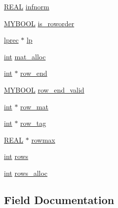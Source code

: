 \begin{DoxyCompactItemize}
\item 
\hyperlink{lp__lib_8h_a92bd5e363d131fa73669358edb232dce}{R\+E\+AL} \hyperlink{struct___m_a_trec_ac508a6beaf47f9f1634eb0cc09e7c870}{infnorm}
\item 
\hyperlink{lp__lib_8h_aad848328fb3018217ac9f01d97b6bd88}{M\+Y\+B\+O\+OL} \hyperlink{struct___m_a_trec_ae03e9166f1ec46d6dd054400e217ec43}{is\+\_\+roworder}
\item 
\hyperlink{lp__types_8h_afe42f1373b9ee8d824b5cad6a22d24c6}{lprec} $\ast$ \hyperlink{struct___m_a_trec_acfc1beee9bcf407edcd1a5e5518073fe}{lp}
\item 
\hyperlink{lp__lib_8h_adeb9ec6400320e4923ac9d836d509ddb}{int} \hyperlink{struct___m_a_trec_afe0a31a251f9914cb7e157411d08f957}{mat\+\_\+alloc}
\item 
\hyperlink{lp__lib_8h_adeb9ec6400320e4923ac9d836d509ddb}{int} $\ast$ \hyperlink{struct___m_a_trec_af3935778185f1cc1f88e0adef34de806}{row\+\_\+end}
\item 
\hyperlink{lp__lib_8h_aad848328fb3018217ac9f01d97b6bd88}{M\+Y\+B\+O\+OL} \hyperlink{struct___m_a_trec_a63fde08fd38c958775d5799fc93a39ae}{row\+\_\+end\+\_\+valid}
\item 
\hyperlink{lp__lib_8h_adeb9ec6400320e4923ac9d836d509ddb}{int} $\ast$ \hyperlink{struct___m_a_trec_a4d44b8f45be1f210c6568cbee45a2c4b}{row\+\_\+mat}
\item 
\hyperlink{lp__lib_8h_adeb9ec6400320e4923ac9d836d509ddb}{int} $\ast$ \hyperlink{struct___m_a_trec_ae8c300b9c822c48ce389b3e7a1c7f2d7}{row\+\_\+tag}
\item 
\hyperlink{lp__lib_8h_a92bd5e363d131fa73669358edb232dce}{R\+E\+AL} $\ast$ \hyperlink{struct___m_a_trec_a6bf03bae314627e747e9f6609bf6bee1}{rowmax}
\item 
\hyperlink{lp__lib_8h_adeb9ec6400320e4923ac9d836d509ddb}{int} \hyperlink{struct___m_a_trec_a66a895315e85fc34caefb10e4279d054}{rows}
\item 
\hyperlink{lp__lib_8h_adeb9ec6400320e4923ac9d836d509ddb}{int} \hyperlink{struct___m_a_trec_a241e86c2f8a4aa2ee624cc6c1942ed51}{rows\+\_\+alloc}
\end{DoxyCompactItemize}


\subsection{Field Documentation}
\mbox{\label{struct___m_a_trec_ad31752d01bf45a9cccbb1f46b81454fe}} 
